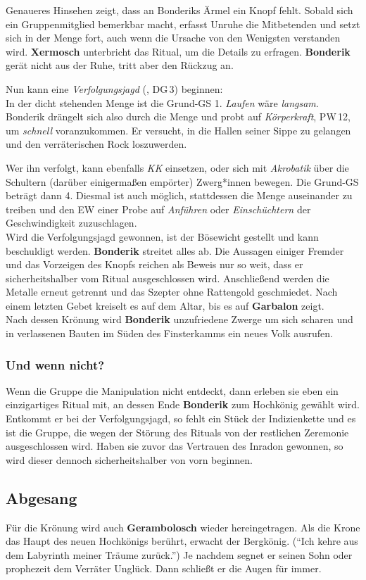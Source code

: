Genaueres Hinsehen zeigt, dass an Bonderiks Ärmel ein Knopf fehlt. Sobald sich ein Gruppenmitglied bemerkbar macht, erfasst Unruhe die Mitbetenden und setzt sich in der Menge fort, auch wenn die Ursache von den Wenigsten verstanden wird. \textbf{Xermosch} unterbricht das Ritual, um die Details zu erfragen.
\textbf{Bonderik} gerät nicht aus der Ruhe, tritt aber den Rückzug an.

Nun kann eine \emph{Verfolgungsjagd} (, DG\,3) beginnen:\\
In der dicht stehenden Menge ist die Grund-GS 1. \emph{Laufen} wäre \emph{langsam}.
Bonderik drängelt sich also durch die Menge und probt auf \emph{Körperkraft}, PW\,12, um \emph{schnell} voranzukommen. Er versucht, in die Hallen seiner Sippe zu gelangen und den verräterischen Rock loszuwerden.

Wer ihn verfolgt, kann ebenfalls \emph{KK} einsetzen, oder sich mit \emph{Akrobatik} über die Schultern (darüber einigermaßen empörter) Zwerg*innen bewegen. Die Grund-GS beträgt dann 4. Diesmal ist auch möglich, stattdessen die Menge auseinander zu treiben und den EW einer Probe auf \emph{Anführen} oder \emph{Einschüchtern} der Geschwindigkeit zuzuschlagen.\\
Wird die Verfolgungsjagd gewonnen, ist der Bösewicht gestellt und kann beschuldigt werden.
\textbf{Bonderik} streitet alles ab. Die Aussagen einiger Fremder und das Vorzeigen des Knopfs reichen als Beweis nur so weit, dass er sicherheitshalber vom Ritual ausgeschlossen wird. Anschließend werden die Metalle erneut getrennt und das Szepter ohne Rattengold geschmiedet. Nach einem letzten Gebet kreiselt es auf dem Altar, bis es auf \textbf{Garbalon} zeigt.\\
Nach dessen Krönung wird \textbf{Bonderik} unzufriedene Zwerge um sich scharen und in verlassenen Bauten im Süden des Finsterkamms ein neues Volk ausrufen.
\subsubsection{Und wenn nicht?}
Wenn die Gruppe die Manipulation nicht entdeckt, dann erleben sie eben ein einzigartiges Ritual mit, an dessen Ende \textbf{Bonderik} zum Hochkönig gewählt wird.
Entkommt er bei der Verfolgungsjagd, so fehlt ein Stück der Indizienkette und es ist die Gruppe, die wegen der Störung des Rituals von der restlichen Zeremonie ausgeschlossen wird.
Haben sie zuvor das Vertrauen des Inradon gewonnen, so wird dieser dennoch sicherheitshalber von vorn beginnen.
\subsection{Abgesang}
Für die Krönung wird auch \textbf{Gerambolosch} wieder hereingetragen.
Als die Krone das Haupt des neuen Hochkönigs berührt, erwacht der Bergkönig. (\enquote{Ich kehre aus dem Labyrinth meiner Träume zurück.}) Je nachdem segnet er seinen Sohn oder prophezeit dem Verräter Unglück.
Dann schließt er die Augen für immer.

